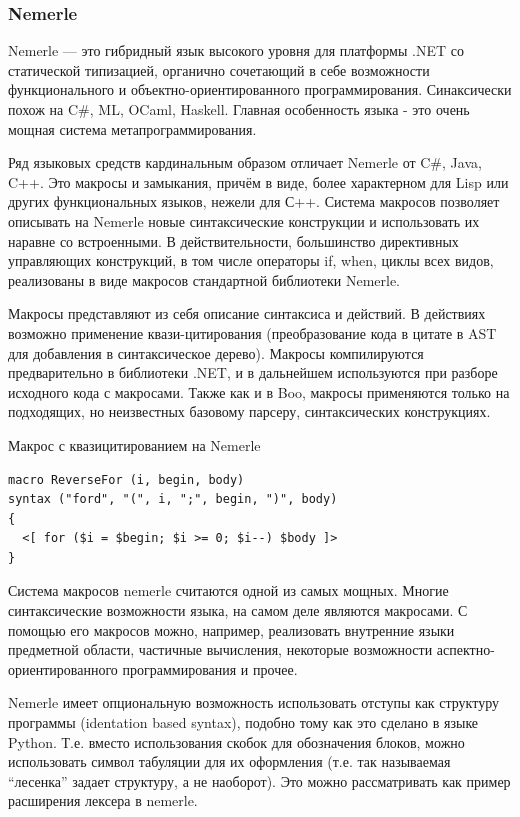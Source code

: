 \documentclass[a4paper,12pt]{article}
\begin{document}
\subsubsection{Nemerle}
Nemerle — это гибридный язык высокого уровня для платформы .NET со статической
типизацией, органично сочетающий в себе возможности функционального и
объектно-ориентированного программирования. Синаксически похож на C\#, ML,
OCaml, Haskell. Главная особенность языка - это очень мощная система
метапрограммирования.

Ряд языковых средств кардинальным образом отличает Nemerle от C\#, Java, C++.
Это макросы и замыкания, причём в виде, более характерном для Lisp или других
функциональных языков, нежели для С++. Система макросов позволяет описывать на
Nemerle новые синтаксические конструкции и использовать их наравне со
встроенными. В действительности, большинство директивных управляющих
конструкций, в том числе операторы if, when, циклы всех видов, реализованы в
виде макросов стандартной библиотеки Nemerle.

Макросы представляют из себя описание синтаксиса и действий. В действиях
возможно применение квази-цитирования (преобразование кода в цитате в AST для
добавления в синтаксическое дерево). Макросы компилируются предварительно в
библиотеки .NET, и в дальнейшем используются при разборе исходного кода с
макросами. Также как и в Boo, макросы применяются только на подходящих, но
неизвестных базовому парсеру, синтаксических конструкциях.

\begin{example}
Макрос с квазицитированием на Nemerle
\end{example}
\begin{verbatim}
macro ReverseFor (i, begin, body) 
syntax ("ford", "(", i, ";", begin, ")", body)
{
  <[ for ($i = $begin; $i >= 0; $i--) $body ]>
}
\end{verbatim}

Система макросов nemerle считаются одной из самых мощных. Многие
синтаксические возможности языка, на самом деле являются макросами. С помощью
его макросов можно, например, реализовать внутренние языки предметной области,
частичные вычисления, некоторые возможности аспектно-ориентированного
программирования и прочее.

Nemerle имеет опциональную возможность использовать отступы как структуру
программы (identation based syntax), подобно тому как это сделано в языке
Python. Т.е. вместо использования скобок для обозначения блоков, можно
использовать символ табуляции для их оформления (т.е. так называемая
``лесенка'' задает структуру, а не наоборот). Это можно рассматривать как
пример расширения лексера в nemerle.
\end{document}

